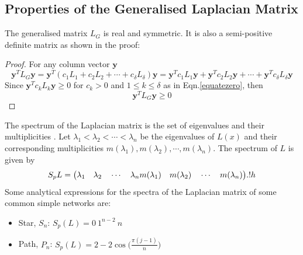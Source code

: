 \documentclass[10pt,a4paper]{article}
\begin{document}
    	    	 \subsection{Properties of the Generalised Laplacian Matrix }
    	    	         The generalised matrix $L_G$ is real and symmetric. It is also a semi-positive definite matrix as shown in the proof:
    	    	         \begin{proof}
    	    	          For any column vector $\mathbf{y}$
    	    	         \begin{equation}
    	    	         \mathbf{y}^T L_{G} \mathbf{y} = \mathbf{y}^T(c_{1}L_{1} + c_{2}L_{2} + \cdots + c_{\delta}L_{\delta} )\mathbf{y}
    	    	         = \mathbf{y}^Tc_{1}L_{1}\mathbf{y} + \mathbf{y}^Tc_{2}L_{2}\mathbf{y} + \cdots + \mathbf{y}^Tc_{\delta}L_{\delta}\mathbf{y} 
    	    	         \end{equation}
    	    	         Since $\mathbf{y}^Tc_{k}L_{k}\mathbf{y} \geq 0$ for $c_{k}>0$ and $1 \leq k \leq \delta$ as in Eqn.\ref{equatezero}, then
    	    	         \begin{equation}
    	    	         \mathbf{y}^T L_{G} \mathbf{y} \geq 0	
    	    	         \end{equation}
    	    	        \end{proof}
    	    	 The spectrum of the Laplacian matrix is the set of eigenvalues and their multiplicities \citep{estrada2011epidemic}. Let $\lambda_1 < \lambda_2 < \cdots < \lambda_n$ be the eigenvalues of $L(x)$ and their corresponding multiplicities $m(\lambda_1), m(\lambda_2), \cdots, m(\lambda_n)$. The spectrum of $L$ is given by
    	    	 \begin{equation}
    	    	 S_p L = \big(\lambda_1 \quad \lambda_2 \quad \cdots \quad \lambda_n \\
    	    	 m(\lambda_1) \quad m(\lambda_2) \quad \cdots \quad m(\lambda_n)  \big).!h
    	    	 \end{equation}
    	    	 Some analytical expressions for the spectra of the Laplacian matrix of some common simple networks are:\\
    	    	 \begin{itemize}
    	    	 	\item Star, $S_n$: $S_p(L) = {0~ 1^{n-2}~ n}$\\
    	    	 	\item Path, $P_n$: $S_p(L) = {2-2\cos\big( \frac{\pi(j-1)}{n}\big) }$
    	    	 \end{itemize}
\end{document}
